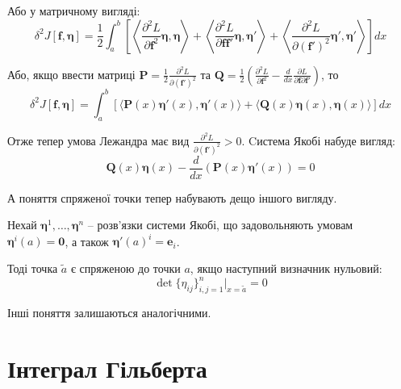 \documentclass[14pt]{extarticle}
\newcommand{\<}{\langle}
\renewcommand{\>}{\rangle}
\theoremstyle{mystyle}{\newtheorem{definition}{Definition}[section]}
\theoremstyle{mystyle}{\newtheorem{proposition}[definition]{Proposition}}
\theoremstyle{mystyle}{\newtheorem{theorem}[definition]{Theorem}}
\theoremstyle{mystyle}{\newtheorem{lemma}[definition]{Lemma}}
\theoremstyle{mystyle}{\newtheorem{corollary}[definition]{Corollary}}
\theoremstyle{mystyle}{\newtheorem*{remark}{Remark}}
\theoremstyle{mystyle}{\newtheorem*{remarks}{Remarks}}
\theoremstyle{mystyle}{\newtheorem*{example}{Example}}
\theoremstyle{mystyle}{\newtheorem*{examples}{Examples}}
\theoremstyle{definition}{\newtheorem*{exercise}{Exercise}}
\theoremstyle{cstyle}{\newtheorem*{cthm}{}}
\theoremstyle{warn}
\begin{document}
Або у матричному вигляді:
\begin{equation}
    \delta^2 J[\mathbf{f},\boldsymbol{\eta}] = \frac{1}{2}\int_a^b\left[\left\langle \frac{\partial^2L}{\partial \mathbf{f}^2}\boldsymbol{\eta},\boldsymbol{\eta} \right\rangle + \left\langle \frac{\partial^2L}{\partial \mathbf{f}\mathbf{f}'}\boldsymbol{\eta},\boldsymbol{\eta}' \right\rangle + \left\langle \frac{\partial^2L}{\partial (\mathbf{f}')^2}\boldsymbol{\eta}',\boldsymbol{\eta}' \right\rangle\right]dx
\end{equation}

Або, якщо ввести матриці $\boldsymbol{P}=\frac{1}{2}\frac{\partial^2 L}{\partial (\mathbf{f}')^2}$ та $\boldsymbol{Q} = \frac{1}{2}\left(\frac{\partial^2 L}{\partial\mathbf{f}^2} - \frac{d}{dx}\frac{\partial L}{\partial\mathbf{f}\partial\mathbf{f}'}\right)$, то
\begin{equation}
    \delta^2 J[\mathbf{f},\boldsymbol{\eta}] = \int_a^b \left[\langle \boldsymbol{P}(x)\boldsymbol{\eta}'(x),\boldsymbol{\eta}'(x)\rangle + \langle \boldsymbol{Q}(x)\boldsymbol{\eta}(x),\boldsymbol{\eta}(x)\rangle\right]dx
\end{equation}

Отже тепер умова Лежандра має вид $\frac{\partial^2 L}{\partial (\mathbf{f}')^2} > 0$. Cистема Якобі набуде вигляд:
\begin{equation}
    \boldsymbol{Q}(x)\boldsymbol{\eta}(x) - \frac{d}{dx}\left(\boldsymbol{P}(x)\boldsymbol{\eta}'(x)\right) = 0
\end{equation}

А поняття спряженої точки тепер набувають дещо іншого вигляду.

\begin{definition}
    Нехай $\boldsymbol{\eta}^1,\dots,\boldsymbol{\eta}^n$ -- розв'язки системи Якобі, що задовольняють умовам $\boldsymbol{\eta}^i(a)=\mathbf{0}$, а також $\boldsymbol{\eta}'(a)^i=\mathbf{e}_i$. 
    
    Тоді точка $\widetilde{a}$ є спряженою до точки $a$, якщо наступний визначник нульовий:
    \begin{equation}
        \det\{\eta_{ij}\}_{i,j=1}^n \Big|_{x=\widetilde{a}} = 0
    \end{equation}
\end{definition}

Інші поняття залишаються аналогічними.

\pagebreak

\section{Інтеграл Гільберта}
\end{document}
